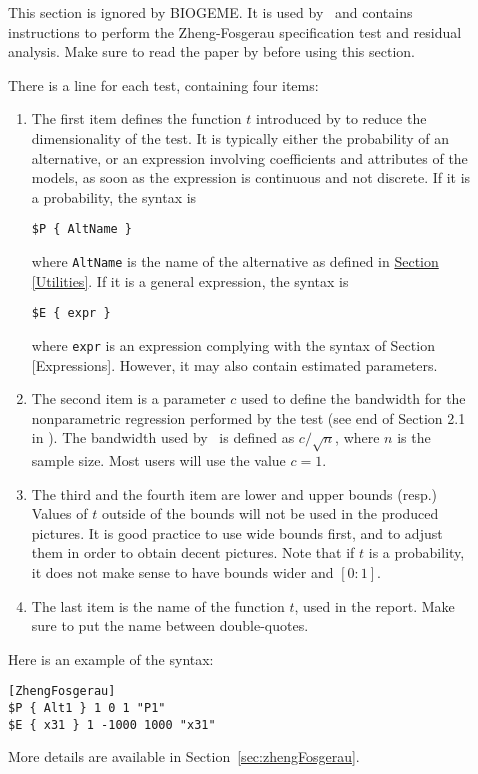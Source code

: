 \documentclass[12pt]{memoir}
\begin{document}
\begin{description}
\item[]  This section is ignored by BIOGEME. It is
      used by \BIOSIM\ and contains instructions to perform the
Zheng-Fosgerau specification test and residual analysis. Make sure to
read the paper by  before using this section.

There is a line for each test, containing four items:
\begin{enumerate}
\item The first item defines the function $t$ introduced by
 to reduce the dimensionality of the test. It is
typically either the probability of an alternative, or an expression
involving coefficients and attributes of the models, as soon as the
expression is continuous and not discrete. If it is a probability, the
syntax is
{\footnotesize
\begin{verbatim}
$P { AltName }
\end{verbatim}
}
where \verb+AltName+ is the name of the alternative as defined in
\hyperlink{Utilities}{Section [Utilities]}. If it is a general
expression, the syntax is 
{\footnotesize
\begin{verbatim}
$E { expr }
\end{verbatim}
}
where \texttt{expr} is an expression complying with the syntax of
Section [Expressions]. However, it may also
contain estimated parameters. 
\item The second item is a parameter $c$ used to define the bandwidth for the
nonparametric regression performed by the test  (see end of Section
2.1 in \cite{Fosg08}). The bandwidth used by \BIOSIM\ is defined as
$c/\sqrt{n}$, where $n$ is the sample size. Most users will use the
value $c=1$.
\item The third and the fourth item are lower and upper bounds
(resp.) Values of $t$ outside of the bounds will not be used in the
produced pictures. It is good practice to use wide bounds first, and
to adjust them in order to obtain decent pictures.  Note that if $t$
is a probability, it does not make sense to have bounds wider and $[0:1]$.
\item The last item is the name of the function $t$, used in the
report. Make sure to put the name between double-quotes.
\end{enumerate}
Here is an example of the syntax:
{\footnotesize
\begin{verbatim}
[ZhengFosgerau]
$P { Alt1 } 1 0 1 "P1"
$E { x31 } 1 -1000 1000 "x31"  
\end{verbatim}
}
More details are available in Section~\ref{sec:zhengFosgerau}.


\end{description}
\end{document}
